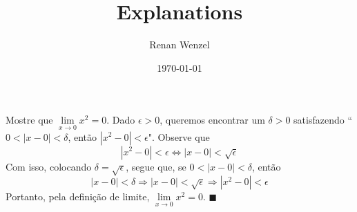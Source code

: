 \documentclass{article}
\title{Explanations}
\author{Renan Wenzel}
\date{\today}
\renewcommand\qedsymbol{$\blacksquare$}
\begin{document}
 \maketitle
    Mostre que $\lim\limits_{x\to0}x^2 = 0.$ Dado $\epsilon > 0$, queremos encontrar um $\delta > 0$ satisfazendo 
  ``$0 < |x-0| < \delta$, ent\~ao $|x^2 - 0| < \epsilon$".  Observe que
 $$
   |x^{2} - 0| < \epsilon\Longleftrightarrow |x - 0| < \sqrt{\epsilon}
 $$
 Com isso, colocando $\delta = \sqrt{\epsilon}$, segue que, se $0 < |x - 0| < \delta$, ent\~ao
 $$
  |x - 0| < \delta\Rightarrow |x - 0| < \sqrt{\epsilon}\Rightarrow |x^2 - 0| < \epsilon
 $$
 Portanto, pela defini\c c\~ao de limite, $\lim\limits_{x\to0}x^{2}=0.$ \qedsymbol
 
\end{document}
